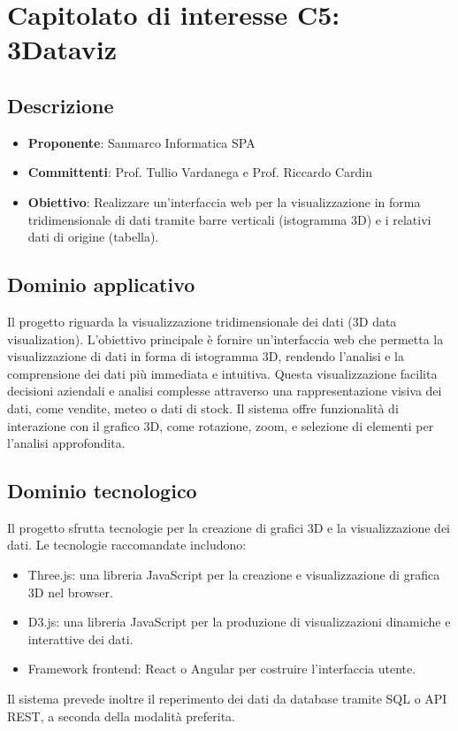 \documentclass[italian, 12pt]{article}
\begin{document}
\section{Capitolato di interesse C5: 3Dataviz}
\subsection{Descrizione}
\begin{itemize}
\item\textbf{Proponente}: Sanmarco Informatica SPA
\item\textbf{Committenti}: Prof. Tullio Vardanega e Prof. Riccardo Cardin
\item\textbf{Obiettivo}: Realizzare un'interfaccia web per la visualizzazione in forma tridimensionale di dati tramite barre verticali (istogramma 3D) e i relativi dati di origine (tabella).
\end{itemize}

\subsection{Dominio applicativo}
Il progetto riguarda la visualizzazione tridimensionale dei dati (3D data visualization). L'obiettivo principale è fornire un'interfaccia web che permetta la visualizzazione di dati in forma di istogramma 3D, rendendo l'analisi e la comprensione dei dati più immediata e intuitiva. Questa visualizzazione facilita decisioni aziendali e analisi complesse attraverso una rappresentazione visiva dei dati, come vendite, meteo o dati di stock. Il sistema offre funzionalità di interazione con il grafico 3D, come rotazione, zoom, e selezione di elementi per l'analisi approfondita.

\subsection{Dominio tecnologico}
Il progetto sfrutta tecnologie per la creazione di grafici 3D e la visualizzazione dei dati. Le tecnologie raccomandate includono:
\begin{itemize}
\item Three.js: una libreria JavaScript per la creazione e visualizzazione di grafica 3D nel browser.
\item D3.js: una libreria JavaScript per la produzione di visualizzazioni dinamiche e interattive dei dati.
\item Framework frontend: React o Angular per costruire l'interfaccia utente.
\end{itemize}
Il sistema prevede inoltre il reperimento dei dati da database tramite SQL o API REST, a seconda della modalità preferita.
\end{document}
